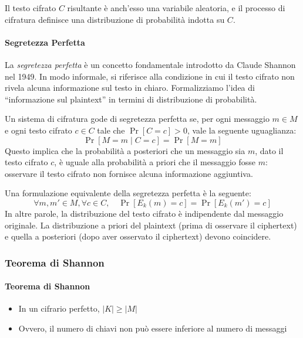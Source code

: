 \documentclass{report}
\begin{document}
  Il testo cifrato $C$ risultante è anch'esso una variabile aleatoria, e il processo di cifratura definisce una distribuzione di probabilità indotta su $C$.

  \paragraph{Segretezza Perfetta}

  La \textit{segretezza perfetta} è un concetto fondamentale introdotto da Claude Shannon nel 1949. In modo informale, si riferisce alla condizione in cui il testo cifrato non rivela alcuna informazione sul testo in chiaro. Formalizziamo l'idea di ``informazione sul plaintext'' in termini di distribuzione di probabilità.
  
  Un sistema di cifratura gode di segretezza perfetta se, per ogni messaggio $m \in M$ e ogni testo cifrato $c \in C$ tale che $\Pr[C = c] > 0$, vale la seguente uguaglianza:
  \[
  \Pr[M = m \mid C = c] = \Pr[M = m]
  \]
  Questo implica che la probabilità a posteriori che un messaggio sia $m$, dato il testo cifrato $c$, è uguale alla probabilità a priori che il messaggio fosse $m$: osservare il testo cifrato non fornisce alcuna informazione aggiuntiva.
  
  Una formulazione equivalente della segretezza perfetta è la seguente:
  \[
  \forall m, m' \in M, \forall c \in C, \quad \Pr[E_k(m) = c] = \Pr[E_k(m') = c]
  \]
  In altre parole, la distribuzione del testo cifrato è indipendente dal messaggio originale. La distribuzione a priori del plaintext (prima di osservare il ciphertext) e quella a posteriori (dopo aver osservato il ciphertext) devono coincidere.
  
  \subsubsection{Teorema di Shannon}

  \paragraph{Teorema di Shannon}
  \begin{itemize}
      \item In un cifrario perfetto, $|K| \geq |M|$
      \item Ovvero, il numero di chiavi non può essere inferiore al numero di messaggi
  \end{itemize}
  
\end{document}
